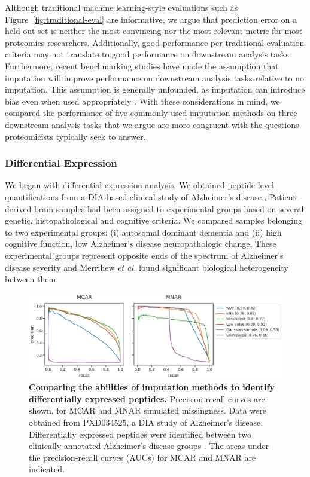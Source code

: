 \documentclass{article}
\begin{document}
Although traditional machine learning-style evaluations such as Figure~\ref{fig:traditional-eval} are informative, we argue that prediction error on a held-out set is neither the most convincing nor the most relevant metric for most proteomics researchers. Additionally, good performance per traditional evaluation criteria may not translate to good performance on downstream analysis tasks. Furthermore, recent benchmarking studies have made the assumption that imputation will improve performance on downstream analysis tasks relative to no imputation. This assumption is generally unfounded, as imputation can introduce bias even when used appropriately \cite{scRNAseq-false-signals, sc-impute-gene-networks}. With these considerations in mind, we compared the performance of five commonly used imputation methods on three downstream analysis tasks that we argue are more congruent with the questions proteomicists typically seek to answer.

\subsubsection{Differential Expression}

We began with differential expression analysis. We obtained peptide-level quantifications from a DIA-based clinical study of Alzheimer's disease \cite{smtg-maccoss}. Patient-derived brain samples had been assigned to experimental groups based on several genetic, histopathological and cognitive criteria. We compared samples belonging to two experimental groups: (i) autosomal dominant dementia and (ii) high cognitive function, low Alzheimer's disease neuropathologic change. These experimental groups represent opposite ends of the spectrum of Alzheimer's disease severity and Merrihew \textit{et al.} found significant biological heterogeneity between them. 

\begin{figure}
  \centering
  \includegraphics[width=1.0\textwidth]{figures/differential-expression-DIA-peptide-figure.pdf}
  \caption{{\bf Comparing the abilities of imputation methods to identify differentially expressed peptides.} Precision-recall curves are shown, for MCAR and MNAR simulated missingness. Data were obtained from PXD034525, a DIA study of Alzheimer's disease. Differentially expressed peptides were identified between two clinically annotated Alzheimer's disease groups \cite{smtg-maccoss}. The areas under the precision-recall curves (AUCs) for MCAR and MNAR are indicated.}
  \label{fig:PR-curves}
\end{figure}
\end{document}
